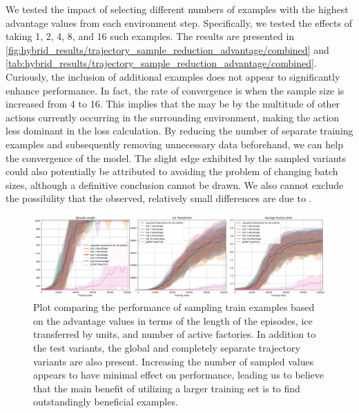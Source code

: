 \noindent We tested the impact of selecting different numbers of examples with the highest advantage values from each environment step. Specifically, we tested the effects of taking 1, 2, 4, 8, and 16 such examples. The results are presented in \autoref{fig:hybrid_results/trajectory_sample_reduction_advantage/combined} and \autoref{tab:hybrid_results/trajectory_sample_reduction_advantage/combined}. Curiously, the inclusion of additional examples does not appear to significantly enhance performance. In fact, the rate of convergence is  when the sample size is increased from 4 to 16. This implies that the  may be  by the multitude of other actions currently occurring in the surrounding environment, making the action less dominant in the loss calculation. By reducing the number of separate training examples and subsequently removing unnecessary data beforehand, we can help the convergence of the model. The slight edge exhibited by the sampled variants could also potentially be attributed to avoiding the problem of changing batch sizes, although a definitive conclusion cannot be drawn. We also cannot exclude the possibility that the observed, relatively small differences are due to .

\begin{figure}[ht]
    \centering
    \includegraphics[width=0.95\linewidth]{images/results_hybrid/trajectory_sample_reduction_advantage/combined.png}
    \captionsetup{justification=justified, singlelinecheck=false, width=1\linewidth, labelfont=bf} 
    \caption[]{Plot comparing the performance of sampling train examples based on the advantage values in terms of the length of the episodes, ice transferred by units, and number of active factories. In addition to the test variants, the global and completely separate trajectory variants are also present. Increasing the number of sampled values appears to have minimal effect on performance, leading us to believe that the main benefit of utilizing a larger training set is to find outstandingly beneficial examples.}
    \label{fig:hybrid_results/trajectory_sample_reduction_advantage/combined}
\end{figure}

